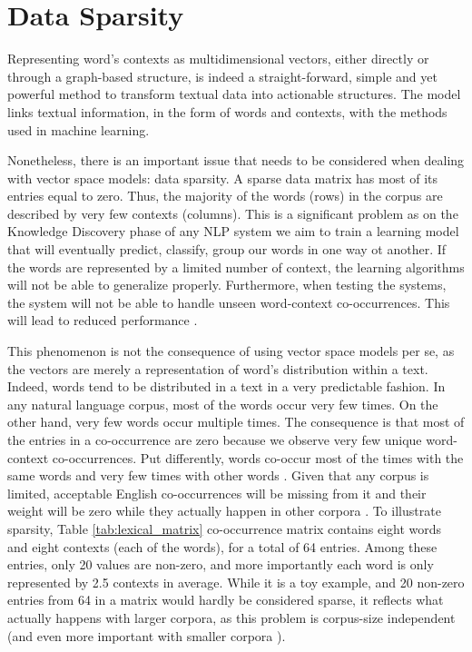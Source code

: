 \section{Data Sparsity}
Representing word's contexts as multidimensional  vectors, either directly or through a graph-based structure, is indeed a straight-forward, simple and  yet powerful method to transform textual data into actionable structures. The model links  textual information, in the form of words and contexts, with the methods used in machine learning.

Nonetheless, there is an important issue that needs to be considered when dealing with vector space models: data sparsity.  A sparse data matrix has most of its entries equal to zero. Thus, the majority of the words (rows) in the corpus are described by very few contexts (columns). This is a significant problem as on the Knowledge Discovery phase of any NLP system we aim to train a learning model that will eventually predict, classify, group our words in one way ot another. If the words are represented by a limited number of context, the learning algorithms will not be able to generalize properly. Furthermore, when testing the systems, the system will not be able to handle unseen word-context co-occurrences. This will lead to reduced performance \cite{phan2008learning}.

This phenomenon is not the consequence of using vector space models per se,  as the vectors are merely a representation of  word's distribution within a text. Indeed, words tend to be distributed in a text in a very predictable fashion. In any natural language corpus, most of the words occur very few times. On the other hand, very few words occur multiple times. The consequence is that most of the entries in a co-occurrence are zero because we observe very few unique word-context co-occurrences. Put differently, words co-occur most of the times with the same words and  very few times with other words \cite{sahlgren2006word}. Given that any corpus is limited, acceptable English co-occurrences will be missing from it and their weight will be zero while they  actually happen in other corpora \cite{JurafskyM17}. To illustrate sparsity, Table \ref{tab:lexical_matrix} co-occurrence matrix contains eight words and eight contexts (each of the words), for a total of 64 entries. Among these entries, only 20 values are non-zero, and more importantly each word is only represented  by 2.5 contexts in average. While it is a toy example, and 20 non-zero entries from 64 in a matrix would hardly be considered sparse, it reflects what actually happens with larger corpora, as this problem is corpus-size independent (and even more important with smaller corpora \cite{perinet2015}). 

